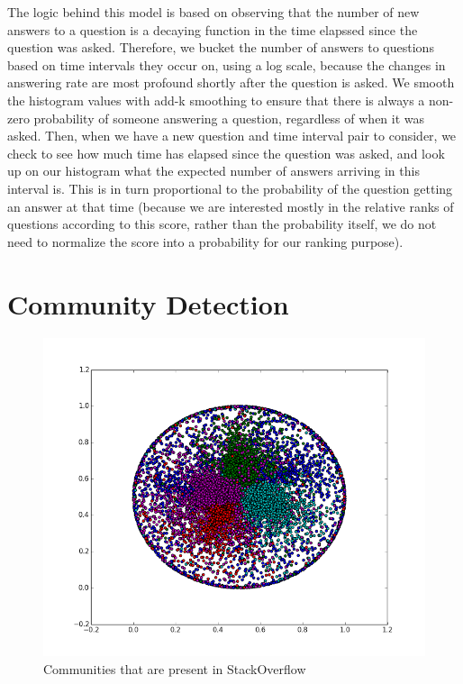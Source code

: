 \documentclass[a4paper]{article}
\begin{document}
The logic behind this model is based on observing that the number of new answers to a question is a decaying function in the time elapssed since the question was asked. Therefore, we bucket the number of answers to questions based on time intervals they occur on, using a log scale, because the changes in answering rate are most profound shortly after the question is asked. We smooth the histogram values with add-k smoothing to ensure that there is always a non-zero probability of someone answering a question, regardless of when it was asked. Then, when we have a new question  and time interval pair to consider, we check to see how much time has elapsed since the question was asked, and look up on our histogram what the expected number of answers arriving in this interval is. This is in turn proportional to the probability of the question getting an answer at that time (because we are interested mostly in the relative ranks of questions according to this score, rather than the probability itself, we do not need to normalize the score into a probability for our ranking purpose).

\section{Community Detection}

\begin{figure}[ht]
\centering
\includegraphics[width=\columnwidth]{community-detection}
\caption{Communities that are present in StackOverflow}
\label{fig:community-detection}
\end{figure}
\end{document}
